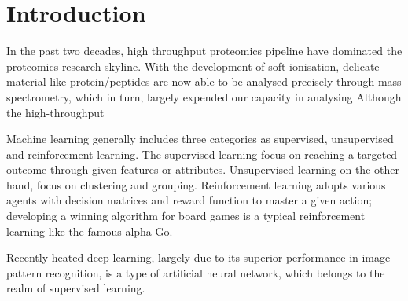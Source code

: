 \section{Introduction}

In the past two decades, high throughput proteomics pipeline have dominated the proteomics research skyline. With the development of soft ionisation, delicate material like protein/peptides are now able to be analysed precisely through mass spectrometry, which in turn, largely expended our capacity in analysing  Although the high-throughput   
\par 
Machine learning generally includes three categories as supervised, unsupervised and reinforcement learning. The supervised learning focus on reaching a targeted outcome through given features or attributes. Unsupervised learning on the other hand, focus on clustering and grouping. Reinforcement learning adopts various agents with decision matrices and reward function to master a given action; developing a winning algorithm for board games is a typical reinforcement learning like the famous alpha Go.
\par
Recently heated deep learning, largely due to its superior performance in image pattern recognition, is a type of artificial neural network, which belongs to the realm of supervised learning. 
